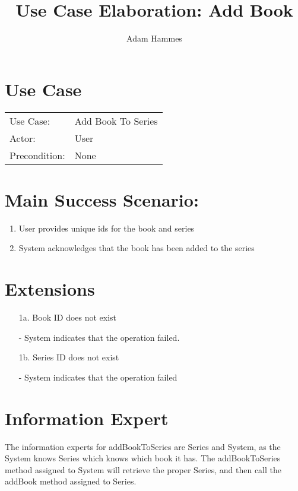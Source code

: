 \documentclass{article}
\title{Use Case Elaboration: Add Book}
\author{Adam Hammes}
\begin{document}
\maketitle

\section*{Use Case}
\begin{tabular}{l l}
  Use Case:     & Add Book To Series    \\
  Actor:        & User        \\
  Precondition: & None \\
\end{tabular}

\section*{Main Success Scenario:}
\begin{enumerate}
  \item User provides unique ids for the book and series
  \item System acknowledges that the book has been added to the series
\end{enumerate}

\section*{Extensions}
\begin{itemize}
  \item [1a.] Book ID does not exist

    - System indicates that the operation failed.
    
  \item [1b.] Series ID does not exist
  
    - System indicates that the operation failed
\end{itemize}

\section*{Information Expert}

The information experts for addBookToSeries are Series and System, as the System knows
Series which knows which book it has.
The addBookToSeries method assigned to System will retrieve the proper Series, and then
call the addBook method assigned to Series.
\end{document}
